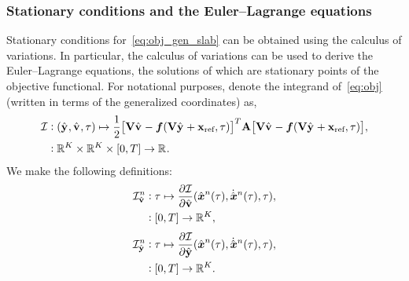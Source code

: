 \subsubsection{Stationary conditions and the Euler--Lagrange equations}
Stationary conditions for~\eqref{eq:obj_gen_slab} can be obtained using the
calculus of variations. In particular, the calculus of variations can be used
to derive the Euler--Lagrange equations, the solutions of which are stationary 
points of the objective functional. For notational purposes, denote the
integrand of~\eqref{eq:obj} (written in terms of the generalized
coordinates) as, 
\begin{equation}\label{eq:integrand}
\begin{split}
 \minintegrandArg{n} & \vcentcolon
(\genstateyDiscreteArgnt{}, \genstateyDiscreteDotArgnt{},\timeDummy) \mapsto \frac{1}{2} \big[
\basisspace \genstateyDiscreteDotArgnt{} - \velocity(\basisspace \genstateyDiscreteArgnt{}
+ \stateIntercept,\timeDummy ) \big]^T \stweightingMatArgt{n}{t} \big[
\basisspace \genstateyDiscreteDotArgnt{}  - \velocity(\basisspace \genstateyDiscreteArgnt{} +
\stateIntercept,\timeDummy) \big], \\ & \vcentcolon \RR{\romdim} \times \RR{\romdim} \times [0,T]
 \rightarrow \RR{} .  
\end{split}
\end{equation}
We make the following definitions:
\begin{equation}
\begin{split}
\dIdV^n  & \vcentcolon
\timeDummy \mapsto \frac{\partial \minintegrand}{\partial \genstateyDiscreteDot} (\genstateArg{n}{\timeDummy}, \genstateDotArg{n}{\timeDummy},\timeDummy), \\ 
& \vcentcolon  [0,T]
 \rightarrow \RR{\romdim} ,
\end{split}
\end{equation}
\begin{equation}
\begin{split}
\dIdY^n  & \vcentcolon
\timeDummy \mapsto \frac{\partial \minintegrand}{\partial \genstateyDiscrete} (\genstateArg{n}{\timeDummy}, \genstateDotArg{n}{\timeDummy},\timeDummy), \\ 
& \vcentcolon  [0,T]
 \rightarrow \RR{\romdim} .  
\end{split}
\end{equation}

